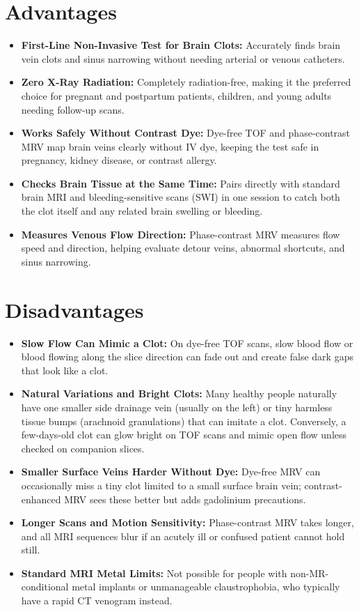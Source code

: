 \section{Advantages}
\begin{itemize}
\item \textbf{First-Line Non-Invasive Test for Brain Clots:} Accurately finds brain vein clots and sinus narrowing without needing arterial or venous catheters.
\item \textbf{Zero X-Ray Radiation:} Completely radiation-free, making it the preferred choice for pregnant and postpartum patients, children, and young adults needing follow-up scans.
\item \textbf{Works Safely Without Contrast Dye:} Dye-free TOF and phase-contrast MRV map brain veins clearly without IV dye, keeping the test safe in pregnancy, kidney disease, or contrast allergy.
\item \textbf{Checks Brain Tissue at the Same Time:} Pairs directly with standard brain MRI and bleeding-sensitive scans (SWI) in one session to catch both the clot itself and any related brain swelling or bleeding.
\item \textbf{Measures Venous Flow Direction:} Phase-contrast MRV measures flow speed and direction, helping evaluate detour veins, abnormal shortcuts, and sinus narrowing.
\end{itemize}

\section{Disadvantages}
\begin{itemize}
\item \textbf{Slow Flow Can Mimic a Clot:} On dye-free TOF scans, slow blood flow or blood flowing along the slice direction can fade out and create false dark gaps that look like a clot.
\item \textbf{Natural Variations and Bright Clots:} Many healthy people naturally have one smaller side drainage vein (usually on the left) or tiny harmless tissue bumps (arachnoid granulations) that can imitate a clot. Conversely, a few-days-old clot can glow bright on TOF scans and mimic open flow unless checked on companion slices.
\item \textbf{Smaller Surface Veins Harder Without Dye:} Dye-free MRV can occasionally miss a tiny clot limited to a small surface brain vein; contrast-enhanced MRV sees these better but adds gadolinium precautions.
\item \textbf{Longer Scans and Motion Sensitivity:} Phase-contrast MRV takes longer, and all MRI sequences blur if an acutely ill or confused patient cannot hold still.
\item \textbf{Standard MRI Metal Limits:} Not possible for people with non-MR-conditional metal implants or unmanageable claustrophobia, who typically have a rapid CT venogram instead.
\end{itemize}

